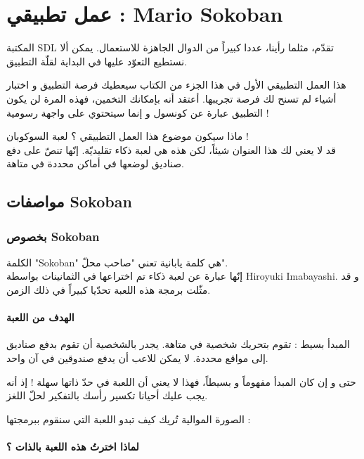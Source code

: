 \chapter{عمل تطبيقي : \textenglish{Mario Sokoban}}

المكتبة
\textenglish{SDL}
تقدّم، مثلما رأينا، عددا كبيراً من الدوال الجاهزة للاستعمال. يمكن ألا نستطيع التعوّد عليها في البداية لقلّة التطبيق.

هذا العمل التطبيقي الأول في هذا الجزء من الكتاب سيعطيك فرصة التطبيق و اختبار أشياء لم تسنح لك فرصة تجريبها.
أعتقد أنه بإمكانك التخمين، فهذه المرة لن يكون التطبيق عبارة عن كونسول و إنما سيتحتوي على واجهة رسومية !

ماذا سيكون موضوع هذا العمل التطبيقي ؟ لعبة السوكوبان !\\
قد لا يعني لك هذا العنوان شيئاً، لكن هذه هي لعبة ذكاء تقليديّة. إنّها تنصّ على دفع صناديق لوضعها في أماكن محددة في متاهة.

\section{مواصفات \textenglish{Sokoban}}

\subsection{بخصوص \textenglish{Sokoban}}

الكلمة
"\textenglish{Sokoban}"
هي كلمة يابانية تعني "صاحب محلّ".\\
إنّها عبارة عن لعبة ذكاء تم اختراعها في الثمانينات بواسطة
\textenglish{Hiroyuki Imabayashi}.
و قد مثّلت برمجة هذه اللعبة تحدّيا كبيراً في ذلك الزمن.

\subsubsection{الهدف من اللعبة}

المبدأ بسيط : تقوم بتحريك شخصية في متاهة. يجدر بالشخصية أن تقوم بدفع صناديق إلى مواقع محددة. لا يمكن للاعب أن يدفع صندوقين في آن واحد.

حتى و إن كان المبدأ مفهوماً و بسيطاً، فهذا لا يعني أن اللعبة في حدّ ذاتها سهلة ! إذ أنه يجب عليك أحيانا تكسير رأسك بالتفكير لحلّ اللغز.

الصورة الموالية تُريك كيف تبدو اللعبة التي سنقوم ببرمجتها :


\subsubsection{لماذا اخترتُ هذه اللعبة بالذات ؟}

